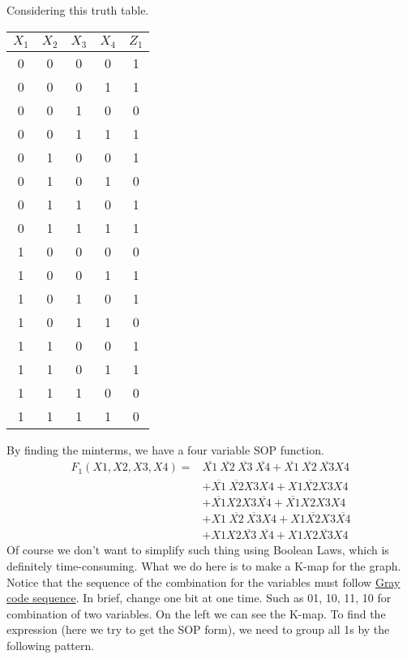 	\begin{example}
		Considering this truth table.
		\begin{table}[H]
			\centering
			\begin{tabular}{|c|c|c|c||c|}
				\hline
				\( X_1 \) & \( X_2 \) & \( X_3 \) & \( X_4 \) & \( Z_1 \) \\
				\hline
				0 & 0 & 0 & 0 & 1 \\
				0 & 0 & 0 & 1 & 1 \\
				0 & 0 & 1 & 0 & 0 \\
				0 & 0 & 1 & 1 & 1 \\
				0 & 1 & 0 & 0 & 1 \\
				0 & 1 & 0 & 1 & 0 \\
				0 & 1 & 1 & 0 & 1 \\
				0 & 1 & 1 & 1 & 1 \\
				1 & 0 & 0 & 0 & 0 \\
				1 & 0 & 0 & 1 & 1 \\
				1 & 0 & 1 & 0 & 1 \\
				1 & 0 & 1 & 1 & 0 \\
				1 & 1 & 0 & 0 & 1 \\
				1 & 1 & 0 & 1 & 1 \\
				1 & 1 & 1 & 0 & 0 \\
				1 & 1 & 1 & 1 & 0 \\
				\hline
			\end{tabular}
		\end{table}
		By finding the minterms, we have a four variable SOP function.
		\begin{align*}
			F_1(X1,X2,X3,X4) = & \overline{X1}\ \overline{X2}\ \overline{X3}\ \overline{X4}+\overline{X1}\ \overline{X2}\ \overline{X3}{X4}\\
			&+\overline{X1}\ \overline{X2}{X3}{X4}+{X1}\overline{X2}{X3}{X4}\\
			&+ \overline{X1}{X2}{X3} \overline{X4}+\overline{X1}{X2}{X3}{X4}\\
			&+{X1}\ \overline{X2}\ \overline{X3}{X4}+{X1} \overline{X2}{X3} \overline{X4}\\
			&+{X1}{X2}\overline{X3}\ \overline{X4}+{X1}{X2}\overline{X3}{X4}
		\end{align*}
		Of course we don't want to simplify such thing using Boolean Laws, which is definitely time-consuming. What we do here is to make a K-map for the graph. Notice that the sequence of the combination for the variables must follow \href{https://www.wikiwand.com/en/Gray_code}{Gray code sequence}. In brief, change one bit at one time. Such as 01, 10, 11, 10 for combination of two variables. On the left we can see the K-map. To find the expression (here we try to get the SOP form), we need to group all 1s by the following pattern.
		

\end{example}
